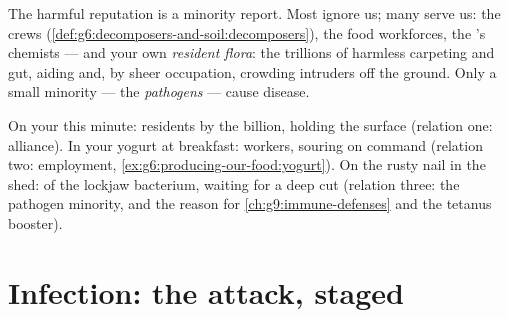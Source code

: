 \begin{proposition}\label{prop:g9:microbes-and-infection:mostly}
The harmful reputation is a minority report. Most 
ignore us; many serve us: the  crews
(\cref{def:g6:decomposers-and-soil:decomposers}), the food
workforces, the 's chemists --- and your own
\emph{resident flora}: the trillions
of harmless  carpeting  and gut, aiding
 and, by sheer occupation, crowding intruders off
the ground. Only a small minority --- the
\emph{pathogens} --- cause disease.
\end{proposition}
\admitted

\begin{example}\label{ex:g9:microbes-and-infection:relations}
On your  this minute: residents by the billion,
holding the surface (relation one: alliance). In your
yogurt at breakfast: workers, souring on command
(relation two: employment,
\cref{ex:g6:producing-our-food:yogurt}). On the rusty
nail in the shed:  of the lockjaw bacterium,
waiting for a deep cut (relation three: the pathogen
minority, and the reason for
\cref{ch:g9:immune-defenses} and the tetanus booster).
\end{example}

\section{Infection: the attack, staged}

